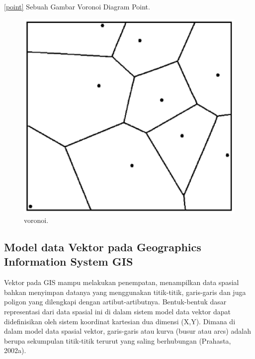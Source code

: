 \begin{enumerate}
\ref{point} Sebuah Gambar Voronoi Diagram Point.
\begin{figure}[ht]
	\centerline{\includegraphics[width=1\textwidth]{figures/voronoi.PNG}}
	\caption{voronoi.}
	\label{voronoi}
	\end{figure}

\subsection{Model data Vektor pada Geographics Information System GIS}
Vektor  pada GIS mampu melakukan penempatan, menampilkan data spasial bahkan menyimpan datanya yang menggunakan titik-titik, garis-garis dan juga poligon yang dilengkapi dengan artibut-artibutnya. Bentuk-bentuk dasar representasi dari data spasial ini di dalam sistem model data vektor dapat didefinisikan oleh sistem koordinat kartesian dua dimensi (X,Y). Dimana di dalam model data spasial vektor, garis-garis atau kurva (busur atau arcs) adalah berupa sekumpulan titik-titik terurut yang saling berhubungan (Prahasta, 2002a). 


\end{enumerate}

